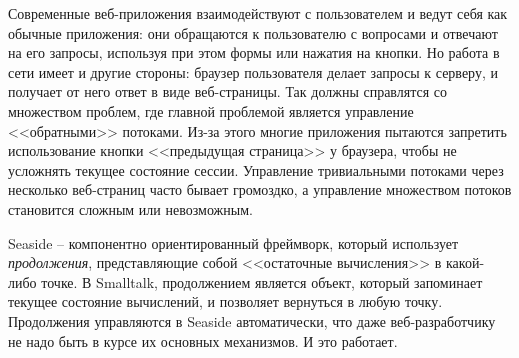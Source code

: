 \documentclass[a4paper,10pt,twoside]{book}
\begin{document}

Современные веб-приложения взаимодействуют с пользователем
и ведут себя как обычные приложения:
они обращаются к пользователю с вопросами и отвечают на его запросы,
используя при этом формы или нажатия на кнопки.
Но работа в сети имеет и другие стороны: браузер пользователя делает
запросы к серверу, и получает от него ответ в виде веб-страницы.
Так  должны справлятся со множеством
проблем, где главной проблемой является управление
<<обратными>> потоками.
Из-за этого многие приложения пытаются запретить использование
кнопки <<предыдущая страница>> у браузера,
чтобы не усложнять текущее состояние сессии.
Управление тривиальными потоками через несколько веб-страниц
часто бывает громоздко,
а управление множеством потоков становится сложным или невозможным.


Seaside -- компонентно ориентированный фреймворк, который использует
\emph{продолжения}, представляющие собой <<остаточные вычисления>>
в какой-либо точке.
В Smalltalk, продолжением является объект,
который запоминает текущее состояние вычислений,
и позволяет вернуться в любую точку. Продолжения управляются в
Seaside автоматически, что даже веб-разработчику не надо быть в курсе
их основных механизмов. И это работает.
\end{document}
